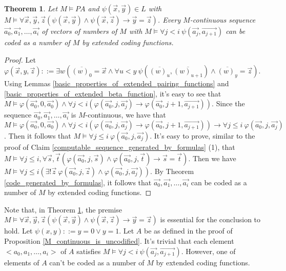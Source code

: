 \documentclass[a4paper,11pt]{article}
\begin{document}
\newtheorem{M_continuous_computation_sequence_is_codified}[definition_of_continuous_sequences]{Theorem}
\begin{M_continuous_computation_sequence_is_codified}\label{M_continuous_computation_sequence_is_codified}
  Let $M\models PA$ and $\psi(\vec{x},\vec{y})\in L$ with $M \models \forall \vec{x},\vec{y},\vec{z} ( \psi(\vec{x},\vec{y}) \wedge \psi(\vec{x},\vec{z}) \rightarrow \vec{y} = \vec{z} )$. Every $M$-continuous sequence $\vec{a_0}, \vec{a_1}, \ldots, \vec{a_i}$ of vectors of numbers of $M$ with $M\models \forall j < i\ \psi(\vec{a_j}, \vec{a_{j+1}})$ can be coded as a number of $M$ by extended coding functions.
\end{M_continuous_computation_sequence_is_codified}
\begin{proof}
  Let $\varphi(\vec{x},y,\vec{z}) ::= \exists w ( \overline{(w)_0} = \vec{x} \wedge \forall u < y\ \psi(\overline{(w)_u}, \overline{(w)_{u+1}})  \wedge \overline{(w)_y} = \vec{z})$. Using Lemmas \ref{basic_properties_of_extended_pairing_functions} and \ref{basic_properties_of_extended_beta_function}, it's easy to see that $M \models \varphi(\vec{a_0},0,\vec{a_0}) \wedge \forall j < i ( \varphi(\vec{a_0},j,\vec{a_j}) \rightarrow \varphi(\vec{a_0},j+1,\vec{a_{j+1}}) )$. Since the sequence $\vec{a_0}, \vec{a_1}, \ldots, \vec{a_i}$ is $M$-continuous, we have that $M \models \varphi(\vec{a_0},0,\vec{a_0}) \wedge \forall j < i ( \varphi(\vec{a_0},j,\vec{a_j}) \rightarrow \varphi(\vec{a_0},j+1,\vec{a_{j+1}}) ) \rightarrow \forall j \leq i\ \varphi(\vec{a_0},j,\vec{a_j})$. Then it follows that $M \models \forall j \leq i\ \varphi(\vec{a_0},j,\vec{a_j})$. It's easy to prove, similar to the proof of Claim \ref{computable_sequence_generated_by_formulas} (1), that $M\models \forall j \leq i, \forall \vec{s},\vec{t} ( \varphi(\vec{a_0},j,\vec{s}) \wedge \varphi(\vec{a_0},j,\vec{t}) \rightarrow \vec{s} = \vec{t} )$. Then we have $M \models \forall j \leq i ( \exists ! \vec{z}\ \varphi(\vec{a_0},j,\vec{z}) \wedge  \varphi(\vec{a_0},j,\vec{a_j}) )$. By Theorem \ref{code_generated_by_formulas}, it follows that $\vec{a_0}, \vec{a_1}, \ldots, \vec{a_i}$ can be coded as a number of $M$ by extended coding functions.
\end{proof}

Note that, in Theorem \ref{M_continuous_computation_sequence_is_codified}, the premise $M \models \forall \vec{x},\vec{y},\vec{z} ( \psi(\vec{x},\vec{y}) \wedge \psi(\vec{x},\vec{z}) \rightarrow \vec{y} = \vec{z} )$ is essential for the conclusion to hold. Let $\psi(x,y) ::= y = 0 \vee y = 1$. Let $A$ be as defined in the proof of Proposition \ref{M_continuous_is_uncodified}. It's trivial that each element $<a_0,a_1,\ldots,a_i>$ of $A$ satisfies $M\models \forall j < i\ \psi(\vec{a_j}, \vec{a_{j+1}})$. However, one of elements of $A$ can't be coded as a number of $M$ by extended coding functions.
\end{document}
